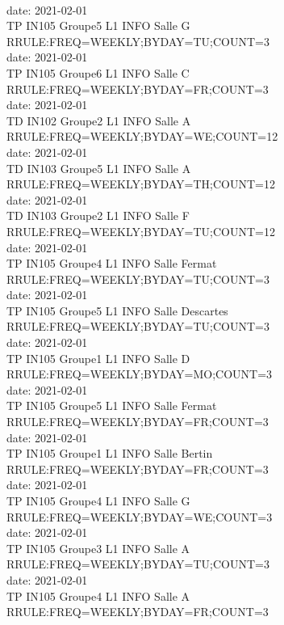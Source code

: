 \documentclass{ltxdoc}
\begin{document}
\begin{center}
\\ date: 2021-02-01\\TP  IN105  Groupe5  L1 INFO  Salle G\\RRULE:FREQ=WEEKLY;BYDAY=TU;COUNT=3
\\ date: 2021-02-01\\TP  IN105  Groupe6  L1 INFO  Salle C\\RRULE:FREQ=WEEKLY;BYDAY=FR;COUNT=3
\\ date: 2021-02-01\\TD  IN102  Groupe2  L1 INFO  Salle A\\RRULE:FREQ=WEEKLY;BYDAY=WE;COUNT=12
\\ date: 2021-02-01\\TD  IN103  Groupe5  L1 INFO  Salle A\\RRULE:FREQ=WEEKLY;BYDAY=TH;COUNT=12
\\ date: 2021-02-01\\TD  IN103  Groupe2  L1 INFO  Salle F\\RRULE:FREQ=WEEKLY;BYDAY=TU;COUNT=12
\\ date: 2021-02-01\\TP  IN105  Groupe4  L1 INFO  Salle Fermat\\RRULE:FREQ=WEEKLY;BYDAY=TU;COUNT=3
\\ date: 2021-02-01\\TP  IN105  Groupe5  L1 INFO  Salle Descartes\\RRULE:FREQ=WEEKLY;BYDAY=TU;COUNT=3
\\ date: 2021-02-01\\TP  IN105  Groupe1  L1 INFO  Salle D\\RRULE:FREQ=WEEKLY;BYDAY=MO;COUNT=3
\\ date: 2021-02-01\\TP  IN105  Groupe5  L1 INFO  Salle Fermat\\RRULE:FREQ=WEEKLY;BYDAY=FR;COUNT=3
\\ date: 2021-02-01\\TP  IN105  Groupe1  L1 INFO  Salle Bertin\\RRULE:FREQ=WEEKLY;BYDAY=FR;COUNT=3
\\ date: 2021-02-01\\TP  IN105  Groupe4  L1 INFO  Salle G\\RRULE:FREQ=WEEKLY;BYDAY=WE;COUNT=3
\\ date: 2021-02-01\\TP  IN105  Groupe3  L1 INFO  Salle A\\RRULE:FREQ=WEEKLY;BYDAY=TU;COUNT=3
\\ date: 2021-02-01\\TP  IN105  Groupe4  L1 INFO  Salle A\\RRULE:FREQ=WEEKLY;BYDAY=FR;COUNT=3

\end{center}
\end{document}
